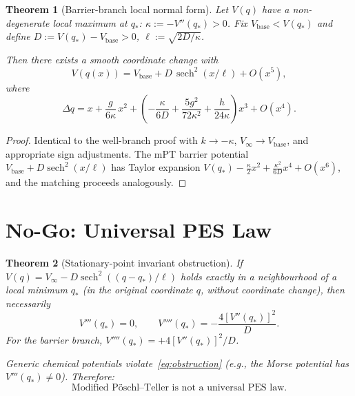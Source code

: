 \documentclass[12pt]{article}
\theoremstyle{plain}
\newtheorem{theorem}{Theorem}[section]
\theoremstyle{definition}
\numberwithin{equation}{section}
\DeclareMathOperator{\sech}{sech}
\begin{document}
\begin{theorem}[Barrier-branch local normal form]\label{thm:barrier}
Let $V(q)$ have a non-degenerate local maximum at $q_*$:
$\kappa:=-V''(q_*)>0$.  Fix $V_{\mathrm{base}}<V(q_*)$ and define
$D:=V(q_*)-V_{\mathrm{base}}>0$, $\ell:=\sqrt{2D/\kappa}$.

Then there exists a smooth coordinate change with
\begin{equation}\label{eq:barnormal}
\boxed{V(q(x)) = V_{\mathrm{base}} + D\,\sech^2(x/\ell) + O(x^5),}
\end{equation}
where
\begin{equation}\label{eq:coordbar}
\Delta q = x
+\frac{g}{6\kappa}\,x^2
+\left(-\frac{\kappa}{6D}+\frac{5g^2}{72\kappa^2}
+\frac{h}{24\kappa}\right)x^3 + O(x^4).
\end{equation}
\end{theorem}

\begin{proof}
Identical to the well-branch proof with $k\to-\kappa$,
$V_\infty\to V_{\mathrm{base}}$, and appropriate sign adjustments.
The mPT barrier potential
$V_{\mathrm{base}}+D\sech^2(x/\ell)$ has Taylor expansion
$V(q_*)-\frac{\kappa}{2}x^2+\frac{\kappa^2}{6D}x^4+O(x^6)$,
and the matching proceeds analogously.
\end{proof}


\section{No-Go: Universal PES Law}\label{sec:nogo_PES}

\begin{theorem}[Stationary-point invariant obstruction]\label{thm:nogo_PES}
If $V(q)=V_\infty-D\sech^2((q-q_*)/\ell)$ holds exactly in a
neighbourhood of a local minimum $q_*$ (in the original coordinate
$q$, without coordinate change), then necessarily
\begin{equation}\label{eq:obstruction}
\boxed{V'''(q_*)=0,\qquad
V''''(q_*)=-\frac{4[V''(q_*)]^2}{D}.}
\end{equation}
For the barrier branch,
$V''''(q_*)=+4[V''(q_*)]^2/D$.

Generic chemical potentials violate~\eqref{eq:obstruction}
(e.g., the Morse potential has $V'''(q_*)\neq 0$).  Therefore:
\begin{equation}
\boxed{\text{Modified P\"oschl--Teller is not a universal PES law.}}
\end{equation}
\end{theorem}
\end{document}
